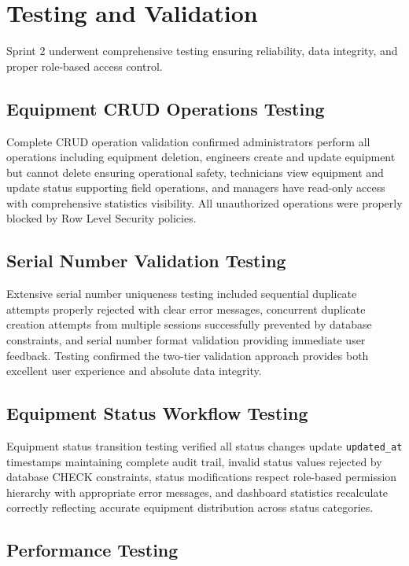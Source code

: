 \section{Testing and Validation}

Sprint 2 underwent comprehensive testing ensuring reliability, data integrity, and proper role-based access control.

\subsection{Equipment CRUD Operations Testing}

Complete CRUD operation validation confirmed administrators perform all operations including equipment deletion, engineers create and update equipment but cannot delete ensuring operational safety, technicians view equipment and update status supporting field operations, and managers have read-only access with comprehensive statistics visibility. All unauthorized operations were properly blocked by Row Level Security policies.

\subsection{Serial Number Validation Testing}

Extensive serial number uniqueness testing included sequential duplicate attempts properly rejected with clear error messages, concurrent duplicate creation attempts from multiple sessions successfully prevented by database constraints, and serial number format validation providing immediate user feedback. Testing confirmed the two-tier validation approach provides both excellent user experience and absolute data integrity.

\subsection{Equipment Status Workflow Testing}

Equipment status transition testing verified all status changes update \texttt{updated\_at} timestamps maintaining complete audit trail, invalid status values rejected by database CHECK constraints, status modifications respect role-based permission hierarchy with appropriate error messages, and dashboard statistics recalculate correctly reflecting accurate equipment distribution across status categories.

\subsection{Performance Testing}

